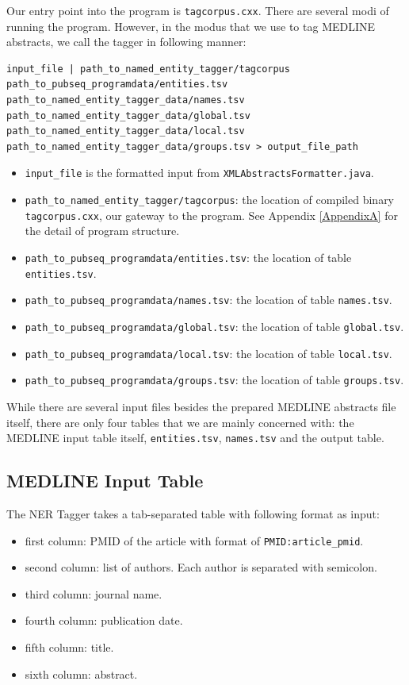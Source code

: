 Our entry point into the program is \texttt{tagcorpus.cxx}. There are several modi of running the program. However, in the modus that we use to tag MEDLINE abstracts, we call the tagger in following manner:


\begin{lstlisting}[breaklines]
input_file | path_to_named_entity_tagger/tagcorpus path_to_pubseq_programdata/entities.tsv path_to_named_entity_tagger_data/names.tsv path_to_named_entity_tagger_data/global.tsv path_to_named_entity_tagger_data/local.tsv path_to_named_entity_tagger_data/groups.tsv > output_file_path
\end{lstlisting}

\begin{itemize}
\item \texttt{input\_file} is the formatted input from \texttt{XMLAbstractsFormatter.java}.
\item \texttt{path\_to\_named\_entity\_tagger/tagcorpus}: the location of compiled binary \texttt{tagcorpus.cxx}, our gateway to the program. See Appendix \ref{AppendixA} for the detail of program structure.
\item \texttt{path\_to\_pubseq\_programdata/entities.tsv}: the location of table \texttt{entities.tsv}.
\item \texttt{path\_to\_pubseq\_programdata/names.tsv}: the location of table \texttt{names.tsv}.
\item \texttt{path\_to\_pubseq\_programdata/global.tsv}: the location of table \texttt{global.tsv}.
\item \texttt{path\_to\_pubseq\_programdata/local.tsv}: the location of table \texttt{local.tsv}.
\item \texttt{path\_to\_pubseq\_programdata/groups.tsv}: the location of table \texttt{groups.tsv}.
\end{itemize}

While there are several input files besides the prepared MEDLINE abstracts file itself, there are only four tables that we are mainly concerned with: the MEDLINE input table itself, \texttt{entities.tsv}, \texttt{names.tsv} and the output table.

\subsection{MEDLINE Input Table}

The NER Tagger takes a tab-separated table with following format as input:

\begin{itemize}
\item first column: PMID of the article with format of \texttt{PMID:article\_pmid}.
\item second column: list of authors. Each author is separated with semicolon.
\item third column: journal name.
\item fourth column: publication date.
\item fifth column: title.
\item sixth column: abstract.
\end{itemize}

